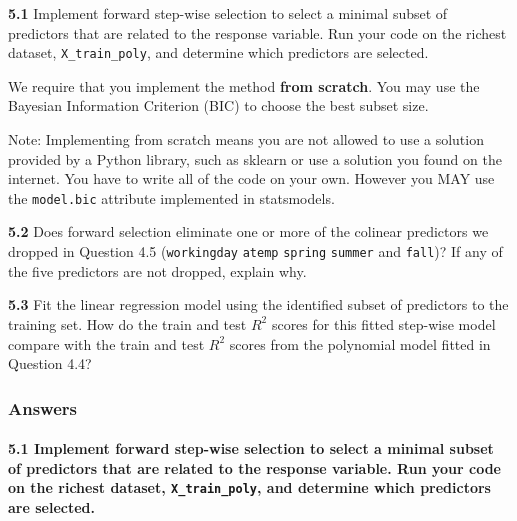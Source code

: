\documentclass[11pt]{article}
\begin{document}
\textbf{5.1} Implement forward step-wise selection to select a minimal
subset of predictors that are related to the response variable. Run your
code on the richest dataset, \texttt{X\_train\_poly}, and determine
which predictors are selected.

We require that you implement the method \textbf{from scratch}. You may
use the Bayesian Information Criterion (BIC) to choose the best subset
size.

Note: Implementing from scratch means you are not allowed to use a
solution provided by a Python library, such as sklearn or use a solution
you found on the internet. You have to write all of the code on your
own. However you MAY use the \texttt{model.bic} attribute implemented in
statsmodels.

\textbf{5.2} Does forward selection eliminate one or more of the
colinear predictors we dropped in Question 4.5 (\texttt{workingday}
\texttt{atemp} \texttt{spring} \texttt{summer} and \texttt{fall})? If
any of the five predictors are not dropped, explain why.

\textbf{5.3} Fit the linear regression model using the identified subset
of predictors to the training set. How do the train and test \(R^2\)
scores for this fitted step-wise model compare with the train and test
\(R^2\) scores from the polynomial model fitted in Question 4.4?

    \subsubsection{Answers}\label{answers}

    \paragraph{\texorpdfstring{\textbf{5.1} Implement forward step-wise
selection to select a minimal subset of predictors that are related to
the response variable. Run your code on the richest dataset,
\texttt{X\_train\_poly}, and determine which predictors are
selected.}{5.1 Implement forward step-wise selection to select a minimal subset of predictors that are related to the response variable. Run your code on the richest dataset, X\_train\_poly, and determine which predictors are selected.}}\label{implement-forward-step-wise-selection-to-select-a-minimal-subset-of-predictors-that-are-related-to-the-response-variable.-run-your-code-on-the-richest-dataset-x_train_poly-and-determine-which-predictors-are-selected.}
\end{document}
